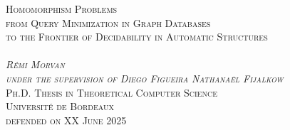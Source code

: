 \begin{titlepage}
\begin{center}
  \Huge\scshape{%
  Homomorphism Problems}\\[.4cm]
  \Large\scshape{%
  from Query Minimization in Graph Databases\\[.2cm]to the Frontier of Decidability in Automatic Structures}\\
  \vspace{5cm}
  \\
  \vfill
  \normalfont%
  \huge{}\emph{Rémi Morvan}\\
  \large\emph{under the supervision of 
  Diego Figueira {\color{maincolor}\fancyand} Nathanaël Fijalkow}\\[1cm]
  \normalfont\Large\scshape
  Ph.D. Thesis in Theoretical Computer Science\\
  \textcolor{maincolor}{Université de Bordeaux}\\
  defended on XX June 2025
\end{center}
\end{titlepage}
\restoregeometry